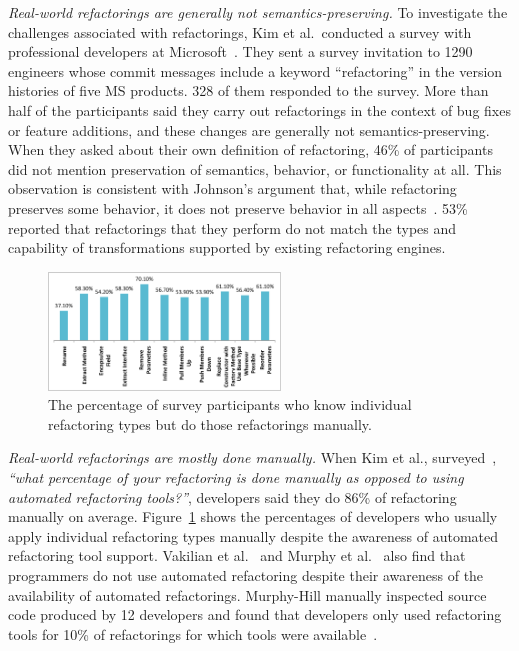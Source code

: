 \documentclass[runningheads,a4paper]{llncs}
\begin{document}
{\it Real-world refactorings are generally not semantics-preserving.} 
To investigate the challenges associated with refactorings, Kim et al.~conducted a survey with professional developers at Microsoft~\cite{Kim2012:FSR}. They sent a survey invitation to 1290 engineers whose commit messages include a keyword ``refactoring'' in the version histories of five MS products. 328 of them responded to the survey. More than half of the participants said they carry out refactorings in the context of bug fixes or feature additions, and these changes are generally not semantics-preserving. When they asked about their own definition of refactoring, 46\% of participants did not mention preservation of semantics, behavior, or functionality at all. This observation is consistent with Johnson's argument that, while refactoring preserves some behavior, it does not preserve behavior in all aspects~\cite{Johnson2011}. 53\% reported that refactorings that they perform do not match the types and capability of transformations supported by existing refactoring engines. 

\begin{figure}[!htb]
\centering
    \includegraphics[width=0.55\textwidth]{images/manualRefactoring.pdf}
\caption{The percentage of survey participants who know individual refactoring types but do those refactorings manually.} 
\label{fig:manualRefactoring} 
\end{figure} 

{\it Real-world refactorings are mostly done manually.} 
When Kim et al., surveyed~\cite{Kim2012:FSR}, {\it ``what percentage of your refactoring is done manually as opposed to using automated refactoring tools?''}, developers said they do 86\% of refactoring manually on average. Figure~\ref{fig:manualRefactoring} shows the percentages of developers who usually apply individual refactoring types manually despite the awareness of automated refactoring tool support. Vakilian et al.~\cite{Vakilian:2012} and Murphy et al.~\cite{Murphy2006:JSD} also find that programmers do not use automated refactoring despite their awareness of the availability of automated refactorings. Murphy-Hill manually inspected source code produced by 12 developers and found that developers only used refactoring tools for 10\% of refactorings for which tools were available~\cite{Murphy-Hill2012:refactor}. 
\end{document}
